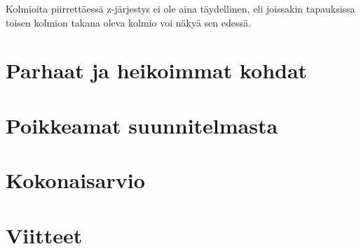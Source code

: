 \documentclass[12pt] {article}
\begin{document}
Kolmioita piirrettäessä z-järjestys ei ole aina täydellinen, eli joissakin tapauksissa toisen kolmion takana oleva kolmio voi näkyä sen edessä.

\section {Parhaat ja heikoimmat kohdat}

\section {Poikkeamat suunnitelmasta}

\section {Kokonaisarvio}

\section {Viitteet}
\end{document}
